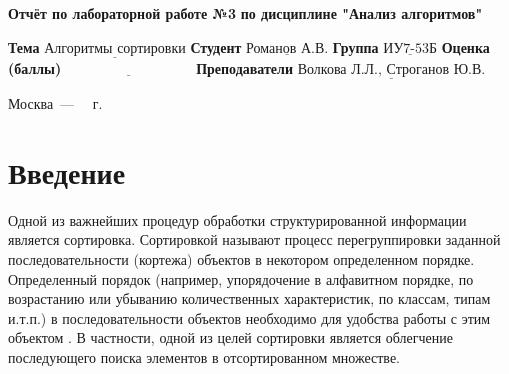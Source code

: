 \documentclass[12pt]{report}
\begin{document}
\begin{titlepage}
	
	\begin{center}
		\noindent\begin{minipage}{1.3\textwidth}\centering
			\Large\textbf{  Отчёт по лабораторной работе №3}\newline
			\textbf{по дисциплине "Анализ алгоритмов"}\newline\newline
		\end{minipage}
	\end{center}
	
	\noindent\textbf{Тема} $\underline{\text{Алгоритмы сортировки}}$\newline\newline
	\noindent\textbf{Студент} $\underline{\text{Романов А.В.}}$\newline\newline
	\noindent\textbf{Группа} $\underline{\text{ИУ7-53Б}}$\newline\newline
	\noindent\textbf{Оценка (баллы)} $\underline{\text{~~~~~~~~~~~~~~~~~~~~~~~~~~~}}$\newline\newline
	\noindent\textbf{Преподаватели} $\underline{\text{Волкова Л.Л., Строганов Ю.В.}}$\newline\newline\newline
	
	\begin{center}
		\vfill
		Москва~---~\the\year
		~г.
	\end{center}
\end{titlepage}


\tableofcontents

\newpage
\chapter*{Введение}


Одной из важнейших процедур обработки структурированной информации является сортировка. Сортировкой называют процесс перегруппировки заданной последовательности (кортежа) объектов в некотором определенном порядке. Определенный порядок (например, упорядочение в алфавитном порядке, по возрастанию или убыванию количественных характеристик, по классам, типам и.т.п.) в последовательности объектов необходимо для удобства работы с этим объектом . В частности, одной из целей сортировки является облегчение последующего поиска элементов в отсортированном множестве. 
\end{document}
